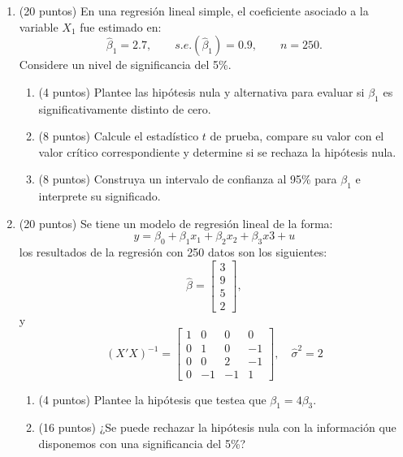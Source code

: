 \documentclass[10pt,a4paper]{article}
\begin{document}
\begin{enumerate}
    \item (20 puntos) En una regresión lineal simple, el coeficiente asociado a la variable
        \(X_1\) fue estimado en:
        \[
          \hat\beta_1 = 2.7,
          \qquad s.e.(\hat\beta_1) = 0.9,
          \qquad n = 250.
        \]
        Considere un nivel de significancia del 5\%.

        \begin{enumerate}[label=\alph*)]
          \item (4 puntos) Plantee las hipótesis nula y alternativa para evaluar si
                \( \beta_1 \) es significativamente distinto de cero.
          \item (8 puntos) Calcule el estadístico \( t \) de prueba, compare su valor
                con el valor crítico correspondiente y determine si se
                rechaza la hipótesis nula.
          \item (8 puntos) Construya un intervalo de confianza al 95\% para
                \( \beta_1 \) e interprete su significado.
        \end{enumerate}


\item (20 puntos) Se tiene un modelo de regresión lineal de la forma:
$$y=\beta_0 + \beta_1 x_1+\beta_2x_2+\beta_3 x3 + u$$
los resultados de la regresión con 250 datos son los siguientes:
        \[
          \hat{\beta} = \begin{bmatrix} 3 \\ 9 \\ 5 \\2 \end{bmatrix},
        \]
y 
        \[
          (X'X)^{-1} =
          \begin{bmatrix}
1 & 0  & 0  &  0\\
0 & 1  & 0  & -1\\
0 & 0  & 2  & -1\\
0 & -1 & -1 &  1
\end{bmatrix},
          \quad \hat{\sigma}^2 = 2
        \]
\begin{enumerate}
    \item (4 puntos) Plantee la hipótesis que testea que $\beta_1=4\beta_3$.

    \item (16 puntos) ¿Se puede rechazar la hipótesis nula con la información que disponemos con una significancia del 5\%?

\end{enumerate}


\end{enumerate}
\end{document}
